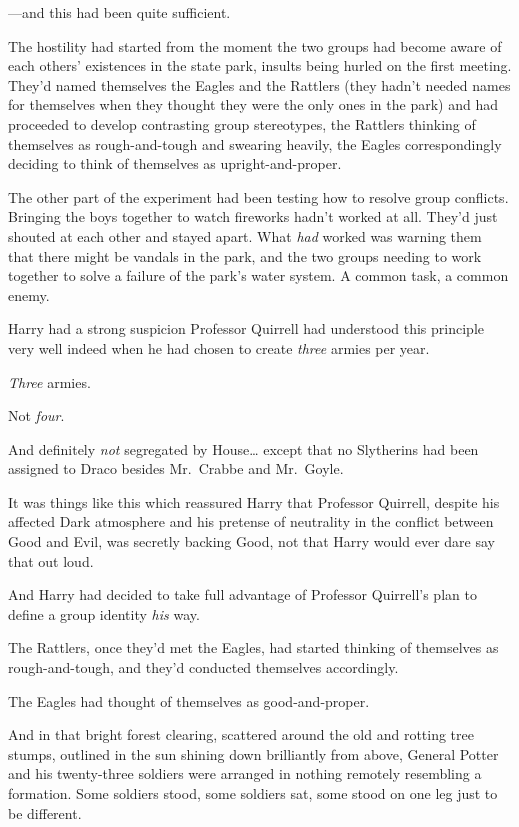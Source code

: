 ---and this had been quite sufficient.

The hostility had started from the moment the two groups had become aware of
each others' existences in the state park, insults being hurled on the first
meeting. They'd named themselves the Eagles and the Rattlers (they hadn't
needed names for themselves when they thought they were the only ones in the
park) and had proceeded to develop contrasting group stereotypes, the Rattlers
thinking of themselves as rough-and-tough and swearing heavily, the Eagles
correspondingly deciding to think of themselves as upright-and-proper.

The other part of the experiment had been testing how to resolve group
conflicts. Bringing the boys together to watch fireworks hadn't worked at all.
They'd just shouted at each other and stayed apart. What \emph{had} worked was
warning them that there might be vandals in the park, and the two groups
needing to work together to solve a failure of the park's water system. A
common task, a common enemy.

Harry had a strong suspicion Professor Quirrell had understood this principle
very well indeed when he had chosen to create \emph{three} armies per year.

\emph{Three} armies.

Not \emph{four}.

And definitely \emph{not} segregated by House{\ldots} except that no Slytherins
had been assigned to Draco besides Mr.~Crabbe and Mr.~Goyle.

It was things like this which reassured Harry that Professor Quirrell, despite
his affected Dark atmosphere and his pretense of neutrality in the conflict
between Good and Evil, was secretly backing Good, not that Harry would ever
dare say that out loud.

And Harry had decided to take full advantage of Professor Quirrell's plan to
define a group identity \emph{his} way.

The Rattlers, once they'd met the Eagles, had started thinking of themselves as
rough-and-tough, and they'd conducted themselves accordingly.

The Eagles had thought of themselves as good-and-proper.

And in that bright forest clearing, scattered around the old and rotting tree
stumps, outlined in the sun shining down brilliantly from above, General Potter
and his twenty-three soldiers were arranged in nothing remotely resembling a
formation. Some soldiers stood, some soldiers sat, some stood on one leg just
to be different.

